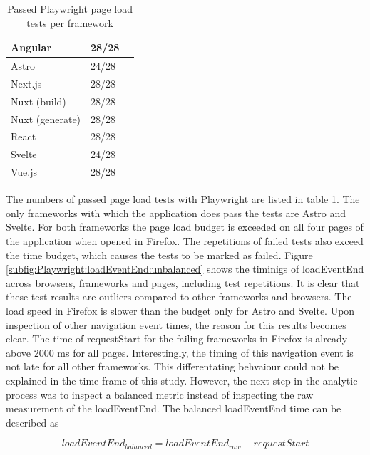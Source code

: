 \documentclass[a4paper, 12pt]{article}
\begin{document}
\begin{table}[!ht]
  \centering
  \begin{tabular}{|l|l|l|}
    \hline
    Angular         & 28/28 \\ \hline
    Astro           & 24/28 \\ \hline
    Next.js         & 28/28 \\ \hline
    Nuxt (build)    & 28/28 \\ \hline
    Nuxt (generate) & 28/28 \\ \hline
    React           & 28/28 \\ \hline
    Svelte          & 24/28 \\ \hline
    Vue.js          & 28/28 \\ \hline
  \end{tabular}
  \caption{Passed Playwright page load tests per framework}
  \label{tab:playwright:pageLoad}
\end{table}

The numbers of passed page load tests with Playwright are listed in table \ref{tab:playwright:pageLoad}.
The only frameworks with which the application does pass the tests are Astro and Svelte.
For both frameworks the page load budget is exceeded on all four pages of the application when opened in Firefox.
The repetitions of failed tests also exceed the time budget, which causes the tests to be marked as failed.
Figure \ref{subfig:Playwright:loadEventEnd:unbalanced} shows the timinigs of loadEventEnd across browsers, frameworks and pages, including test repetitions.
It is clear that these test results are outliers compared to other frameworks and browsers.
The load speed in Firefox is slower than the budget only for Astro and Svelte.
Upon inspection of other navigation event times, the reason for this results becomes clear.
The time of requestStart for the failing frameworks in Firefox is already above 2000 ms for all pages.
Interestingly, the timing of this navigation event is not late for all other frameworks.
This differentating behvaiour could not be explained in the time frame of this study.
However, the next step in the analytic process was to inspect a balanced metric instead of inspecting the raw measurement of the loadEventEnd.
The balanced loadEventEnd time can be described as

\begin{equation}
\mathit{loadEventEnd}_\mathit{balanced} = \mathit{loadEventEnd}_\mathit{raw} - \mathit{requestStart}
\end{equation}
\end{document}
